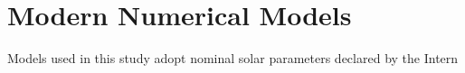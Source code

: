 \section{Modern Numerical Models}
Models used in this study adopt nominal solar parameters declared by the Intern